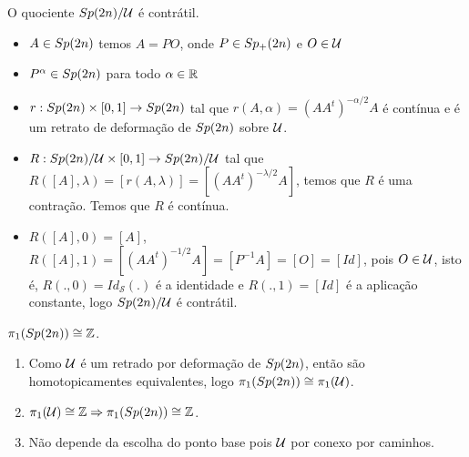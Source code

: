 \documentclass{beamer}
\begin{document}
	\begin{frame}
		
		\begin{teorema}
			O quociente $Sp(2n)/\mathcal{U}$ é contrátil.
		\end{teorema}
		\begin{prova}
			
			\begin{itemize}
				\item $A \in Sp(2n)$ temos $A=PO$, onde $P \in Sp_{+}(2n)$ e $O \in \mathcal{U}$
				
				\pause
				\item $P^{\alpha} \in Sp(2n)$ para todo $\alpha \in \mathbb{R}^{}$
				
				\pause
				\item $r:Sp(2n)\times [0,1] \to Sp(2n)$ tal que $r(A, \alpha) = (AA^{t})^{-\alpha/2}A$ é contínua e é um retrato de deformação de $Sp(2n)$ sobre $\mathcal{U}$.
				
				\pause
				\item $R:Sp(2n)/\mathcal{U} \times [0,1] \to Sp(2n)/\mathcal{U}$ tal que $R([A], \lambda) = [r(A, \lambda)] = [(AA^{t})^{-\lambda/2}A]$, temos que $R$ é uma contração. Temos que $R$ é contínua.
				
				\pause
				\item $R([A], 0) = [A]$, $R([A], 1) = [(AA^{t})^{-1/2}A] = [P^{-1}A] = [O] = [Id]$, pois $O \in \mathcal{U}$, isto é, $R(., 0) = Id_{\mathcal{S}}(.)$ é a identidade e $R(., 1) = [Id]$ é a aplicação constante, logo $Sp(2n)/\mathcal{U} $ é contrátil.
		\end{itemize}
		\end{prova}
	\end{frame}
	
	\begin{frame}
		
		\begin{teorema}
			$\pi_{1}(Sp(2n)) \cong \mathbb{Z}$.
		\end{teorema}
		\begin{prova}
			\begin{enumerate}
				\item Como $\mathcal{U}$ é um retrado por deformação de $Sp(2n)$, então são homotopicamentes equivalentes, logo $\pi_{1}(Sp(2n)) \cong \pi_{1}(\mathcal{U})$.
				
				\pause
				\item $\pi_{1}(\mathcal{U}) \cong \mathbb{Z} \Rightarrow \pi_{1}(Sp(2n)) \cong \mathbb{Z}$.
				
				\pause
				\item Não depende da escolha do ponto base pois $\mathcal{U}$ por conexo por caminhos.
			\end{enumerate}
		\end{prova}
	\end{frame}
	
\end{document}
